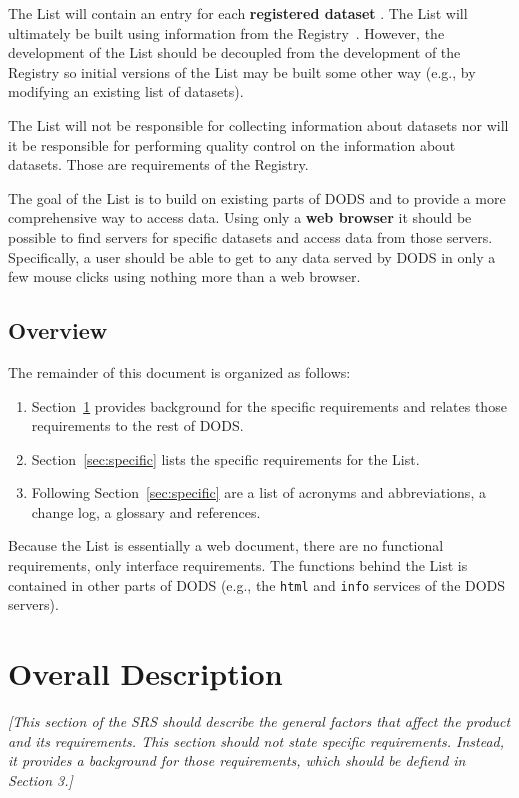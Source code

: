 \documentclass{article}
\begin{document}
The List will contain an entry for each \textbf{registered dataset}
. The List will ultimately be built using 
information from the Registry~\cite{gallagher:registry-srs}. However, the
development of the List should be decoupled from the development of the
Registry so initial versions of the List may be built some other way (e.g.,
by modifying an existing list of datasets).

The List will not be responsible for collecting information about datasets
nor will it be responsible for performing quality control on the information
about datasets. Those are requirements of the Registry.

The goal of the List is to build on existing parts of DODS and to provide a
more comprehensive way to access data. Using only a \textbf{web browser}
 it should be possible to find servers for
specific datasets and access data from those servers. Specifically, a user
should be able to get to any data served by DODS in only a few mouse clicks
using nothing more than a web browser.

\subsection{Overview}

The remainder of this document is organized as follows:
\begin{enumerate}
\item Section~\ref{sec:overall} provides background for the specific
requirements and relates those requirements to the rest of DODS.
\item Section~\ref{sec:specific} lists the specific requirements for the List.
\item Following Section~\ref{sec:specific} are a list of acronyms and
  abbreviations, a change log, a glossary and references.
\end{enumerate}

Because the List is essentially a web document, there are no functional
requirements, only interface requirements. The functions behind the List is
contained in other parts of DODS (e.g., the \texttt{html} and \texttt{info}
services of the DODS servers).

\section{Overall Description}
\label{sec:overall}

\emph{[This section of the SRS should describe the general factors that
  affect the product and its requirements. This section should not state
  specific requirements. Instead, it provides a background for those
  requirements, which should be defiend in Section 3.]}
\end{document}

